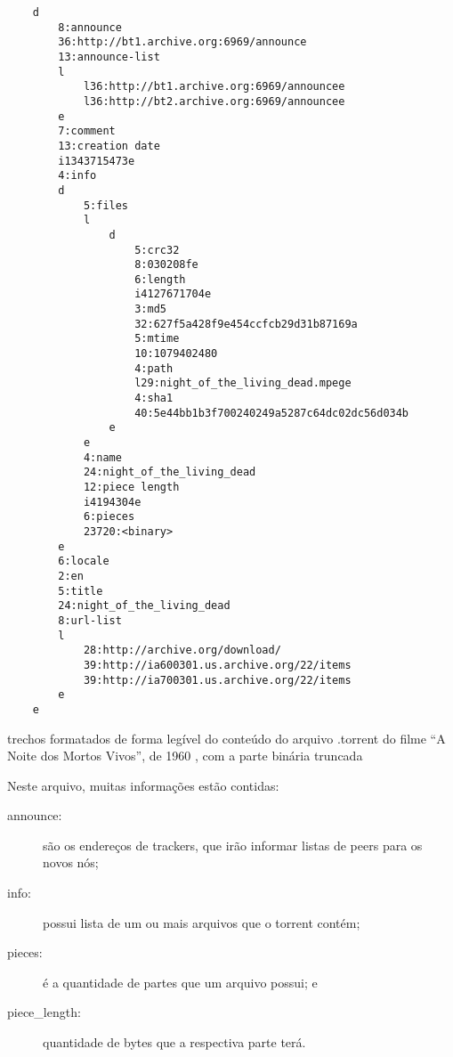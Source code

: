 \begin{listing}[H]
    \begin{verbatim}
    d
        8:announce
        36:http://bt1.archive.org:6969/announce
        13:announce-list
        l
            l36:http://bt1.archive.org:6969/announcee
            l36:http://bt2.archive.org:6969/announcee
        e
        7:comment
        13:creation date
        i1343715473e
        4:info
        d
            5:files
            l
                d
                    5:crc32
                    8:030208fe
                    6:length
                    i4127671704e
                    3:md5
                    32:627f5a428f9e454ccfcb29d31b87169a
                    5:mtime
                    10:1079402480
                    4:path
                    l29:night_of_the_living_dead.mpege
                    4:sha1
                    40:5e44bb1b3f700240249a5287c64dc02dc56d034b
                e
            e
            4:name
            24:night_of_the_living_dead
            12:piece length
            i4194304e
            6:pieces
            23720:<binary>
        e
        6:locale
        2:en
        5:title
        24:night_of_the_living_dead
        8:url-list
        l
            28:http://archive.org/download/
            39:http://ia600301.us.archive.org/22/items
            39:http://ia700301.us.archive.org/22/items
        e
    e
    \end{verbatim}
    \caption{trechos formatados de forma legível do conteúdo do arquivo .torrent do
    filme \enquote{A Noite dos Mortos Vivos}, de 1960 \cite{torrent-file}, com a parte
    binária truncada}
    \label{lst:torrent-file-code}
\end{listing}

\newpage
Neste arquivo, muitas informações estão contidas:

\begin{description}
    \item[announce:] são os endereços de \glspl*{tracker}, que irão informar
        listas de \glspl*{peer} para os novos nós;

    \item[info:] possui lista de um ou mais arquivos que o \gls*{torrent} contém;

    \item[pieces:] é a quantidade de partes que um arquivo possui; e

    \item[piece\_length:] quantidade de bytes que a respectiva parte terá.
\end{description}

